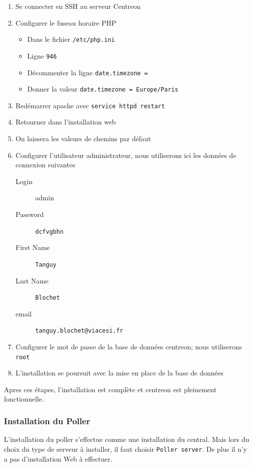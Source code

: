 	\begin{enumerate}
		\item Se connecter en SSH au serveur Centreon
		\item Configurer le fuseau horaire PHP
		\begin{itemize}
			\item Dans le fichier \texttt{/etc/php.ini}
			\item Ligne \texttt{946}
			\item Décommenter la ligne \texttt{date.timezone = }
			\item Donner la valeur \texttt{date.timezone = Europe/Paris}
		\end{itemize}
		\item Redémarrer apache avec \texttt{service httpd restart}
		\item Retourner dans l'installation web
		\item On laissera les valeurs de chemins par défaut
		\item Configurer l'utilisateur administrateur, nous utiliserons ici les données de connexion suivantes
		\begin{description}
			\item[Login] admin
			\item[Password] \texttt{dcfvgbhn}
			\item[First Name] \texttt{Tanguy}
			\item[Last Name] \texttt{Blochet}
			\item[email] \texttt{tanguy.blochet@viacesi.fr}
		\end{description}
		\item Configurer le mot de passe de la base de données centreon; nous utiliserons \texttt{root}
		\item L'installation se poursuit avec la mise en place de la base de données
	\end{enumerate}

	Apres ces étapes, l'installation est complète et centreon est pleinement fonctionnelle.

	\subsubsection{Installation du Poller}

	L'installation du poller s'effectue comme une installation du central.
	Mais lors du choix du type de serveur à installer, il faut choisir \texttt{Poller server}.
	De plus il n'y a pas d'installation Web à effectuer.

